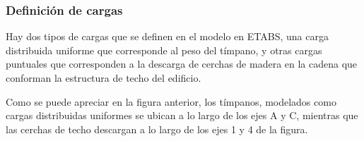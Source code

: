     
\subsubsection{Definición de cargas}
Hay dos tipos de cargas que se definen en el modelo en ETABS, una carga distribuida uniforme que corresponde al peso del tímpano, y otras cargas puntuales que corresponden a la descarga de cerchas de madera en la cadena que conforman la estructura de techo del edificio.


Como se puede apreciar en la figura anterior, los tímpanos, modelados como cargas distribuidas uniformes se ubican a lo largo de los ejes A y C, mientras que las cerchas de techo descargan a lo largo de los ejes 1 y 4 de la figura.

